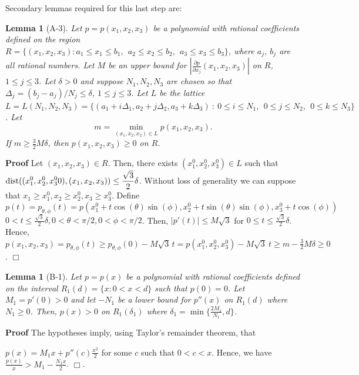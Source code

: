 \documentclass[12pt]{article}
\newcommand{\ds}{\displaystyle}
\newtheorem{lemma}[theorem]{Lemma}
\begin{document}
Secondary lemmas required for this last step are:


\begin{lemma}[A-3]  \label{lem:poly3}
Let $p = p(x_1,x_2,x_3)$ be a polynomial with rational coefficients defined on the region 
$R = \{ (x_1,x_2,x_3) : a_1 \le x_1 \le b_1,\ \ a_2 \le x_2 \le b_2,\ \ a_3 \le x_3 \le b_3\}$, where $a_j,\ b_j$ are 
all rational numbers. Let $M$ be an upper bound for  ${\ds |\frac{\partial p}{\partial x_j}(x_1,x_2,x_3)|}$ on $R$, $1 \le j \le 3$.   
Let $\delta > 0 $ and suppose $N_1, N_2, N_3$ are chosen so that
$\Delta_j = (b_j-a_j)/N_j \le \delta$, $1 \le j \le 3$.  Let $L$ be the lattice
$L = L(N_1,N_2,N_3) = \{ (a_1 + i\Delta_1,a_2 + j\Delta_2,a_3 + k\Delta_3)\  :\  0 \le i \le N_1,\ \   0 \le j \le N_2,
\ \  0 \le k \le N_3\}$.
Let 
$$m = \min_{(x_1,x_2,x_2) \in L} p(x_1,x_2,x_3) . $$  
If $m \ge \frac{3}{2}M\delta$, then $p(x_1,x_2,x_3) \ge 0$ on $R$.
\end{lemma}
\textbf{Proof}
Let $(x_1,x_2,x_3) \in R$.  Then, there exists $(x_1^0,x_2^0,x_3^0) \in L$ such that ${\ds {\rm dist}( (x_1^0,x_2^0,x_3^00),(x_1,x_2,x_3) ) \le \frac{\sqrt{3}}{2}\delta}$.  Without loss of generality we can suppose that 
$x_1 \ge x_1^0, x_2 \ge x_2^0, x_3 \ge x_3^0$.
Define 
$$p(t) = p_{\theta,\phi}(t) = p(x_1^0+t\cos(\theta)\sin(\phi),x_2^0+t\sin(\theta)\sin(\phi),x_3^0+t\cos(\phi))$$ 
$0 < t \le \frac{\sqrt{3}}{2}\delta, 0 < \theta < \pi/2, 0 < \phi < \pi/2$.  Then, $\left | p'(t) \right | \le M\sqrt{3}$ for $0 \le t \le \frac{\sqrt{3}}{2}\delta$.
Hence, $p(x_1,x_2,x_3) = p_{\theta,\phi}(t) \ge p_{\theta,\phi}(0) - M\sqrt{3}\, t = p(x_1^0,x_2^0,x_3^0) - M \sqrt{3}\ t \ge m - \frac{3}{2}M \delta \ge 0$. $\Box$

\vspace{0.1in}

\begin{lemma}[B-1] \label{lem:est1}
Let $p = p(x)$ be a polynomial with rational coefficients defined on the interval $R_1(d) = \{ x : 0 < x < d\}$ such
that $p(0) = 0$.  Let $M_1 = p'(0) > 0$ and let $-N_1$ be a lower bound for $p''(x)$ on $R_1(d)$ where $N_1 \ge 0$.  Then, $p(x) > 0$ on $R_1(\delta_1)$ where $\delta_1 = \min\{\frac{2 M_1}{N_1},d\}$.
\end{lemma}
\textbf{Proof}
The hypotheses imply, using Taylor's remainder theorem, that 

\noindent ${\ds p(x) = M_1 x + p''(c)\frac{x^2}{2} }$ for some $c$ such that $0 < c < x$.  Hence, we have ${\ds \frac{p(x)}{x} > M_1 - \frac{N_1 x}{2} }$.  $\Box$.
\end{document}
